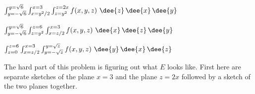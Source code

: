 %

\begin{answer}
$\int_{y=-\sqrt{6}}^{y=\sqrt{6}}\int_{x=y^2/2}^{x=3}\int_{z=y^2}^{z=2x}
                f(x,y,z)\ \dee{z}\,\dee{x}\,\dee{y}$

$\int_{y=-\sqrt{6}}^{y=\sqrt{6}}\int_{z=y^2}^{z=6}\int_{x=z/2}^{x=3}
                f(x,y,z)\ \dee{x}\,\dee{z}\,\dee{y}$

$\int_{z=0}^{z=6}\int_{x=z/2}^{x=3}\int_{y=-\sqrt{z}}^{y=\sqrt{z}}
                f(x,y,z)\ \dee{y}\,\dee{x}\,\dee{z}$
\end{answer}

\begin{solution}
The hard part of this problem is figuring out what $E$ looks like.
First here are separate sketches of the plane $x=3$ and the plane
$z=2x$ followed by a sketch of the two planes together.


\end{solution}
